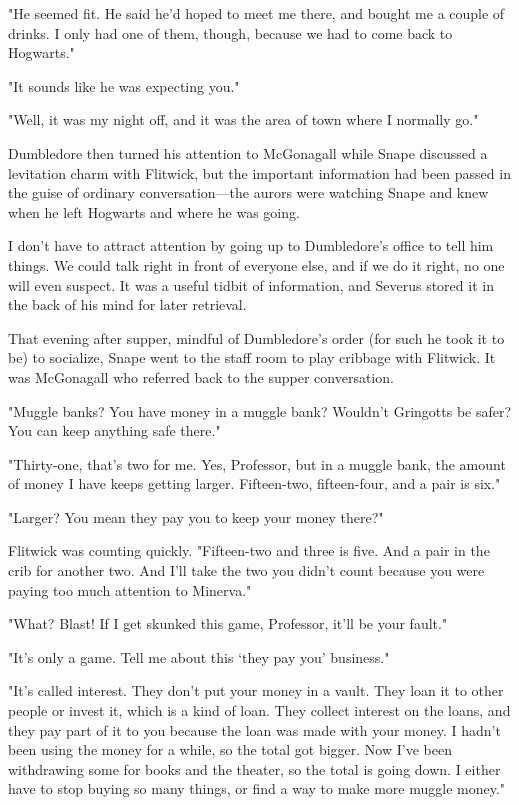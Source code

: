 "He seemed fit. He said he'd hoped to meet me there, and bought me a couple of drinks. I only had one of them, though, because we had to come back to Hogwarts."

"It sounds like he was expecting you."

"Well, it was my night off, and it was the area of town where I normally go."

Dumbledore then turned his attention to McGonagall while Snape discussed a levitation charm with Flitwick, but the important information had been passed in the guise of ordinary conversation—the aurors were watching Snape and knew when he left Hogwarts and where he was going.

I don't have to attract attention by going up to Dumbledore's office to tell him things. We could talk right in front of everyone else, and if we do it right, no one will even suspect. It was a useful tidbit of information, and Severus stored it in the back of his mind for later retrieval.

That evening after supper, mindful of Dumbledore's order (for such he took it to be) to socialize, Snape went to the staff room to play cribbage with Flitwick. It was McGonagall who referred back to the supper conversation.

"Muggle banks? You have money in a muggle bank? Wouldn't Gringotts be safer? You can keep anything safe there."

"Thirty-one, that's two for me. Yes, Professor, but in a muggle bank, the amount of money I have keeps getting larger. Fifteen-two, fifteen-four, and a pair is six."

"Larger? You mean they pay you to keep your money there?"

Flitwick was counting quickly. "Fifteen-two and three is five. And a pair in the crib for another two. And{\el} I'll take the two you didn't count because you were paying too much attention to Minerva."

"What? Blast! If I get skunked this game, Professor, it'll be your fault."

"It's only a game. Tell me about this `they pay you' business."

"It's called interest. They don't put your money in a vault. They loan it to other people or invest it, which is a kind of loan. They collect interest on the loans, and they pay part of it to you because the loan was made with your money. I hadn't been using the money for a while, so the total got bigger. Now I've been withdrawing some for books and the theater, so the total is going down. I either have to stop buying so many things, or find a way to make more muggle money."

